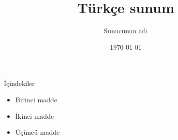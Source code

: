 \documentclass{beamer}
\title{Türkçe sunum}
\author{Sunucunun adı}
\date{\today}
\begin{document}
\begin{frame}
  \titlepage
\end{frame}

\begin{frame}{İçindekiler}
  \begin{itemize}
    \item Birinci madde
    \item İkinci madde
    \item Üçüncü madde
  \end{itemize}
\end{frame}
\end{document}
